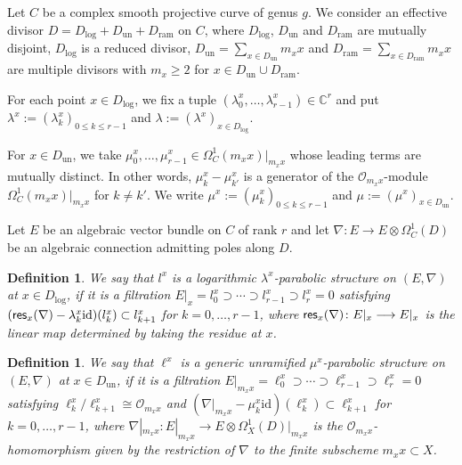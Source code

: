 \documentclass[pdftex]{sigma}
\numberwithin{equation}{section}
\newtheorem{Definition}[Theorem]{Definition}
\newcommand{\res}{\mathop{\sf res}\nolimits}
\begin{document}
Let $C$ be a complex smooth projective curve of genus $g$.
We consider an effective divisor
$D=D_{\mathrm{log}}+D_{\mathrm{un}}+D_{\mathrm{ram}}$ on $C$,
where
$D_{\mathrm{log}}$, $D_{\mathrm{un}}$ and $D_{\mathrm{ram}}$ are mutually disjoint,
$D_{\mathrm{log}}$ is a reduced divisor,
$D_{\mathrm{un}}=\sum_{x\in D_{\mathrm{un}}} m_x x$
and
$D_{\mathrm{ram}}=\sum_{x\in D_{\mathrm{ram}}} m_x x$
are multiple divisors with $m_x\geq 2$ for
$x\in D_{\mathrm{un}} \cup D_{\mathrm{ram}}$.

For each point $x\in D_{\mathrm{log}}$,
we fix a tuple $(\lambda_0^x,\dots,\lambda_{r-1}^x)\in\mathbb{C}^r$
and put
$\lambda^x:=(\lambda^x_k)_{0\leq k\leq r-1}$
and $\lambda:=(\lambda^x)_{x\in D_{\mathrm{log}}}$.

For $x\in D_{\mathrm{un}}$, we take
$\mu^x_0,\dots,\mu^x_{r-1}\in \Omega^1_C(m_x x)\big|_{m_x x}$
whose leading terms are mutually distinct.
In other words, $\mu^x_k- \mu^x_{k'}$ is a generator of the ${\mathcal O}_{m_xx}$-module
$\Omega^1_C(m_x x)\big|_{m_xx}$ for $k\neq k'$.
We write
$\mu^x:=(\mu^x_k)_{0\leq k\leq r-1}$
and
$\mu:=(\mu^x)_{x\in D_{\mathrm{un}}}$.

Let $E$ be an algebraic vector bundle on $C$
of rank $r$ and let
$\nabla\colon E\longrightarrow E\otimes \Omega^1_C(D)$
be an algebraic connection admitting poles along $D$.

\begin{Definition}
We say that $l^x$ is a logarithmic $\lambda^x$-parabolic structure on $(E,\nabla)$
at $x\in D_{\mathrm{log}}$,
if it is a filtration $E|_x=l^x_0\supset\cdots\supset l^x_{r-1}\supset l^x_r=0$ satisfying
$(\res_x(\nabla)-\lambda^x_k\mathrm{id})(l^x_k)\subset l^x_{k+1}$
for $k=0,\dots,r-1$, where
$\res_x(\nabla)\colon E|_x \longrightarrow E|_x$
is the linear map determined by taking the residue at $x$.
\end{Definition}

\begin{Definition}We say that $\ell^x$ is a generic unramified $\mu^x$-parabolic structure
on $(E,\nabla)$ at $x\in D_{\mathrm{un}}$, if it is a filtration
$E|_{m_xx}=\ell^x_0\supset\cdots\supset \ell^x_{r-1}\supset \ell^x_r=0$
satisfying
$\ell^x_k/\ell^x_{k+1}\cong {\mathcal O}_{m_xx}$ and
$(\nabla|_{m_xx}-\mu^x_k\mathrm{id})(\ell^x_k)\subset \ell^x_{k+1}$
for $k=0,\dots,r-1$,
where $\nabla|_{m_xx} \colon E|_{m_xx} \longrightarrow E\otimes\Omega_X^1(D)|_{m_xx}$
is the ${\mathcal O}_{m_xx}$-homomorphism given by the restriction of
$\nabla$ to the finite subscheme $m_xx\subset X$.
\end{Definition}
\end{document}

